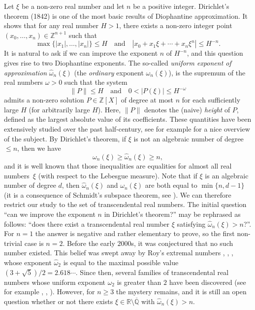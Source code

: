 \documentclass[JEP,XML,SOM,Unicode,NoFloatCountersInSection,published]{cedram}
\newcommand\bQ{\mathbb{Q}}
\newcommand\bR{\mathbb{R}}
\newcommand\bZ{\mathbb{Z}}
\newcommand\homega{\widehat{\omega}}\newcommand\HH{\mathcal{H}}
\newcommand{\normH}[1]{\|#1\|}
\newcommand\AND{\quad\text{and}\quad}
\theoremstyle{definition}
\theoremstyle{plain}
\begin{document}
Let $\xi$ be a non-zero real number and let $n$ be a positive integer. Dirichlet's theorem (1842) is one of the most basic results of Diophantine approximation. It shows that for any real number $H > 1$, there exists a non-zero integer point $(x_0,\dots,x_n)\in\bZ^{n+1}$ such that
\begin{equation}
\label{eq: Dirichlet system}
\max\big\{|x_1|,\dots,|x_n|\big\} \leq H \AND |x_0 + x_1\xi + \cdots + x_n\xi^n| \leq H^{-n}.
\end{equation}
It is natural to ask if we can improve the exponent $n$ of $H^{-n}$, and this question gives rise to two Diophantine exponents. The so-called \emph{uniform exponent of approximation} $\homega_n(\xi)$ (\resp the \emph{ordinary} exponent $\omega_n(\xi)$), is the supremum of the real numbers $\omega > 0$ such that the system
\begin{equation*}
\normH{P} \leq H \AND 0 <|P(\xi)| \leq H^{-\omega}
\end{equation*}
admits a non-zero solution $P\in\bZ[X]$ of degree at most $n$ for each sufficiently large $H$ (\resp for arbitrarily large $H$). Here, $\normH{P}$ denotes the (naive) \emph{height} of $P$, defined as the largest absolute value of its coefficients. These quantities have been extensively studied over the past half-century, see for example \cite{bugeaud2015exponents} for a nice overview of the subject. By Dirichlet's theorem, if $\xi$ is not an algebraic number of degree $\leq n$, then we have
\[
\omega_n(\xi) \geq \homega_n(\xi) \geq n,
\]
and it is well known that those inequalities are equalities for almost all real numbers~$\xi$ (with respect to the Lebesgue measure). Note that if $\xi$ is an algebraic number of degree $d$, then $\homega_n(\xi)$ and $\omega_n(\xi)$ are both equal to $\min\{n,d-1\}$ (it is a consequence of Schmidt's subspace theorem, see \cite[Th.\,2.10]{bugeaud2015exponents}). We can therefore restrict our study to the set of transcendental real numbers. The initial question ``can we improve the exponent $n$ in Dirichlet's theorem?'' may be rephrased as follows: ``does there exist a transcendental real number $\xi$ satisfying $\homega_n(\xi) > n$?''. For $n=1$ the answer is negative and rather elementary to prove, so the first non-trivial case is $n=2$. Before the early $2000$s, it was conjectured that no such number existed. This belief was swept away by Roy's extremal numbers \cite{roy2003approximation}, \cite{roy2004approximation}, \cite{arbourRoyCriterionDegreTwo}, whose exponent $\homega_2$ is equal to the maximal possible value $(3+\sqrt 5)/2 = 2.618\cdots$. Since then, several families of transcendental real numbers whose uniform exponent $\homega_2$ is greater than $2$ have been discovered (see for example \cite{roy2007two}, \cite{bugeaud2005exponentsSturmian}, \cite{poels2017exponents, poelsExpoGeneralClass2021}). However, for $n \geq 3$ the mystery remains, and it is still an open question whether or not there exists $\xi\in\bR\setminus\overline{\bQ}$ with $\homega_n(\xi) > n$.
\end{document}
